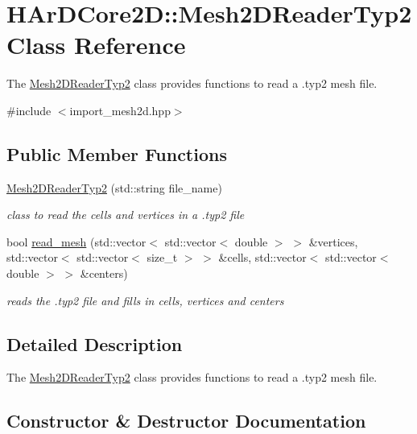 \hypertarget{classHArDCore2D_1_1Mesh2DReaderTyp2}{}\section{H\+Ar\+D\+Core2D\+:\+:Mesh2\+D\+Reader\+Typ2 Class Reference}
\label{classHArDCore2D_1_1Mesh2DReaderTyp2}


The \hyperlink{classHArDCore2D_1_1Mesh2DReaderTyp2}{Mesh2\+D\+Reader\+Typ2} class provides functions to read a .typ2 mesh file.  




{\ttfamily \#include $<$import\+\_\+mesh2d.\+hpp$>$}

\subsection*{Public Member Functions}
\begin{DoxyCompactItemize}
\item 
\hyperlink{classHArDCore2D_1_1Mesh2DReaderTyp2_a7a45023236b7fb6d1d56a21d16c345f3}{Mesh2\+D\+Reader\+Typ2} (std\+::string file\+\_\+name)
\begin{DoxyCompactList}\small\item\em class to read the cells and vertices in a .typ2 file \end{DoxyCompactList}\item 
bool \hyperlink{classHArDCore2D_1_1Mesh2DReaderTyp2_a7ae7c26bf4242e528e1a7c6a0f3dce07}{read\+\_\+mesh} (std\+::vector$<$ std\+::vector$<$ double $>$ $>$ \&vertices, std\+::vector$<$ std\+::vector$<$ size\+\_\+t $>$ $>$ \&cells, std\+::vector$<$ std\+::vector$<$ double $>$ $>$ \&centers)
\begin{DoxyCompactList}\small\item\em reads the .typ2 file and fills in cells, vertices and centers \end{DoxyCompactList}\end{DoxyCompactItemize}


\subsection{Detailed Description}
The \hyperlink{classHArDCore2D_1_1Mesh2DReaderTyp2}{Mesh2\+D\+Reader\+Typ2} class provides functions to read a .typ2 mesh file. 

\subsection{Constructor \& Destructor Documentation}
\mbox{\label{classHArDCore2D_1_1Mesh2DReaderTyp2_a7a45023236b7fb6d1d56a21d16c345f3}} 

